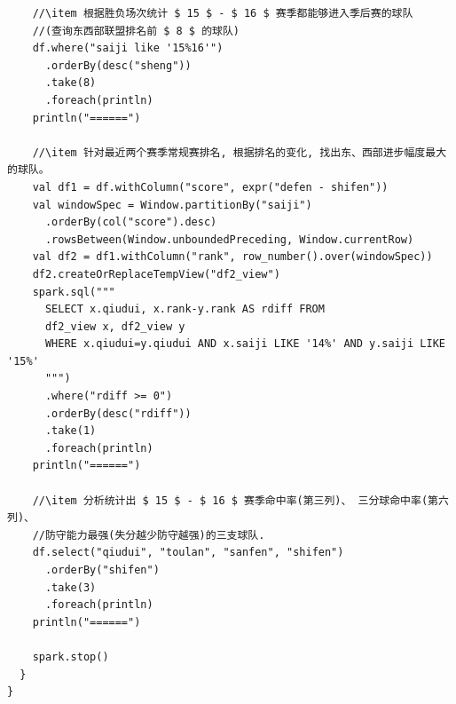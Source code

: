\documentclass{article}
\begin{document}
\begin{center}
\begin{verbatim}
    //\item 根据胜负场次统计 $ 15 $ - $ 16 $ 赛季都能够进入季后赛的球队
    //(查询东西部联盟排名前 $ 8 $ 的球队)
    df.where("saiji like '15%16'")
      .orderBy(desc("sheng"))
      .take(8)
      .foreach(println)
    println("======")

    //\item 针对最近两个赛季常规赛排名, 根据排名的变化, 找出东、西部进步幅度最大的球队。
    val df1 = df.withColumn("score", expr("defen - shifen"))
    val windowSpec = Window.partitionBy("saiji")
      .orderBy(col("score").desc)
      .rowsBetween(Window.unboundedPreceding, Window.currentRow)
    val df2 = df1.withColumn("rank", row_number().over(windowSpec))
    df2.createOrReplaceTempView("df2_view")
    spark.sql("""
      SELECT x.qiudui, x.rank-y.rank AS rdiff FROM
      df2_view x, df2_view y
      WHERE x.qiudui=y.qiudui AND x.saiji LIKE '14%' AND y.saiji LIKE '15%'
      """)
      .where("rdiff >= 0")
      .orderBy(desc("rdiff"))
      .take(1)
      .foreach(println)
    println("======")

    //\item 分析统计出 $ 15 $ - $ 16 $ 赛季命中率(第三列)、 三分球命中率(第六列)、
    //防守能力最强(失分越少防守越强)的三支球队.
    df.select("qiudui", "toulan", "sanfen", "shifen")
      .orderBy("shifen")
      .take(3)
      .foreach(println)
    println("======")

    spark.stop()
  }
}
\end{verbatim}
\end{center}
\end{document}
